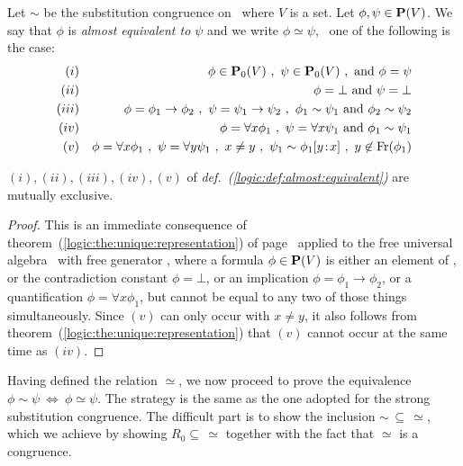 \begin{defin}\label{logic:def:almost:equivalent}
Let $\sim$ be the substitution congruence on \pv\ where $V$ is a
set. Let $\phi,\psi\in\mbox{${\bf P}(V)$}$. We say that $\phi$ is {\em almost
equivalent to $\psi$} and we write $\phi\simeq\psi$, \ifand\ one of
the following is the case:
    \begin{eqnarray*}
    (i)&&\phi\in\pvo\ ,\ \psi\in\pvo\ ,\ \mbox{and}\ \phi=\psi\\
    (ii)&&\phi=\bot\ \mbox{and}\ \psi=\bot\\
    (iii)&&\phi=\phi_{1}\to\phi_{2}\ ,\ \psi=\psi_{1}\to\psi_{2}\ ,\
    \phi_{1}\sim\psi_{1}\ \mbox{and}\ \phi_{2}\sim\psi_{2}\\
    (iv)&&\phi=\forall x\phi_{1}\ ,\ \psi=\forall x\psi_{1}\ \mbox{and}\ \phi_{1}\sim\psi_{1}\\
    (v)&&\phi=\forall x\phi_{1}\ ,\ \psi=\forall y\psi_{1}\ ,\ x\neq y\ ,\
    \psi_{1}\sim \phi_{1}[y\!:\!x]\ ,\ y\not\in\free(\phi_{1})
    \end{eqnarray*}
\end{defin}
\begin{prop}
$(i),(ii),(iii),(iv), (v)$ of {\em
def.~(\ref{logic:def:almost:equivalent})} are mutually exclusive.
\end{prop}
\begin{proof}
This is an immediate consequence of
theorem~(\ref{logic:the:unique:representation}) of
page~\pageref{logic:the:unique:representation} applied to the free
universal algebra \pv\ with free generator \pvo, where a formula
$\phi\in\mbox{${\bf P}(V)$}$ is either an element of \pvo, or the contradiction
constant $\phi=\bot$, or an implication $\phi=\phi_{1}\to\phi_{2}$,
or a quantification $\phi=\forall x\phi_{1}$, but cannot be equal to
any two of those things simultaneously. Since $(v)$ can only occur
with $x\neq y$, it also follows from
theorem~(\ref{logic:the:unique:representation}) that $(v)$ cannot
occur at the same time as $(iv)$.
\end{proof}

Having defined the relation $\simeq$, we now proceed to prove the
equivalence $\phi\sim\psi\ \Leftrightarrow\ \phi\simeq\psi$. The
strategy is the same as the one adopted for the strong substitution
congruence. The difficult part is to show the inclusion
$\sim\,\subseteq\,\simeq$, which we achieve by showing
$R_{0}\subseteq\,\simeq$ together with the fact that $\simeq$ is a
congruence.

